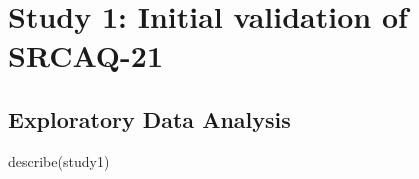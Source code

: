 \documentclass[
]{article}
\newenvironment{Shaded}{\begin{snugshade}}{\end{snugshade}}
\newcommand{\FunctionTok}[1]{\textcolor[rgb]{0.00,0.00,0.00}{#1}}
\newcommand{\NormalTok}[1]{#1}
\begin{document}
\hypertarget{study-1-initial-validation-of-srcaq-21}{%
\section{Study 1: Initial validation of
SRCAQ-21}\label{study-1-initial-validation-of-srcaq-21}}

\hypertarget{exploratory-data-analysis}{%
\subsection{Exploratory Data Analysis}\label{exploratory-data-analysis}}

\begin{Shaded}
\begin{Highlighting}[]
\FunctionTok{describe}\NormalTok{(study1)}
\end{Highlighting}
\end{Shaded}
\end{document}
